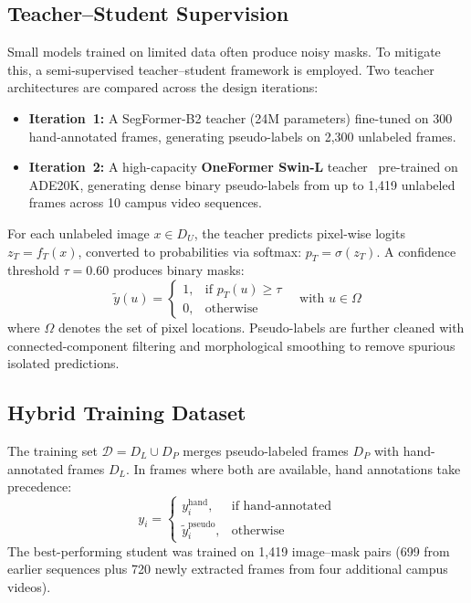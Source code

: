 \documentclass[12pt,letterpaper,oneside]{report}
\begin{document}
\subsection{Teacher--Student Supervision}
\label{sec:teacher_student}

Small models trained on limited data often produce noisy masks. To mitigate this, a semi-supervised teacher--student framework is employed. Two teacher architectures are compared across the design iterations:

\begin{itemize}[nosep]
  \item \textbf{Iteration~1:} A SegFormer-B2 teacher (24M parameters) fine-tuned on 300 hand-annotated frames, generating pseudo-labels on 2,300 unlabeled frames.
  \item \textbf{Iteration~2:} A high-capacity \textbf{OneFormer Swin-L} teacher~\cite{oneformer} pre-trained on ADE20K, generating dense binary pseudo-labels from up to 1,419 unlabeled frames across 10 campus video sequences.
\end{itemize}

For each unlabeled image $x \in D_U$, the teacher predicts pixel-wise logits $z_T = f_T(x)$, converted to probabilities via softmax: $p_T = \sigma(z_T)$. A confidence threshold $\tau = 0.60$ produces binary masks:
\begin{equation}
\tilde{y}(u) =
\begin{cases}
1,& \text{if } p_T(u) \ge \tau \\
0,& \text{otherwise}
\end{cases}
\quad \text{with } u \in \Omega
\end{equation}
where $\Omega$ denotes the set of pixel locations. Pseudo-labels are further cleaned with connected-component filtering and morphological smoothing to remove spurious isolated predictions.


\subsection{Hybrid Training Dataset}

The training set $\mathcal{D} = D_L \cup D_P$ merges pseudo-labeled frames $D_P$ with hand-annotated frames $D_L$. In frames where both are available, hand annotations take precedence:
\begin{equation}
y_i =
\begin{cases}
y_i^{\text{hand}}, & \text{if hand-annotated} \\
\tilde{y}_i^{\text{pseudo}}, & \text{otherwise}
\end{cases}
\end{equation}
The best-performing student was trained on 1,419 image--mask pairs (699 from earlier sequences plus 720 newly extracted frames from four additional campus videos).
\end{document}
